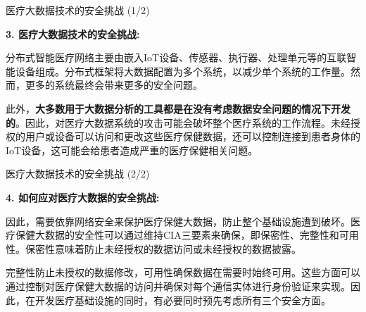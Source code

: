 \documentclass{beamer}
\begin{document}

\begin{frame}{医疗大数据技术的安全挑战 (1/2)}
    \small  %
    
    \textbf{3. 医疗大数据技术的安全挑战:}
    
    \vspace{0.2cm}
    分布式智能医疗网络主要由嵌入IoT设备、传感器、执行器、处理单元等的互联智能设备组成。分布式框架将大数据配置为多个系统，以减少单个系统的工作量。然而，更多的系统最终会带来更多的安全问题。
    
    \vspace{0.2cm}
    此外，\textbf{大多数用于大数据分析的工具都是在没有考虑数据安全问题的情况下开发的}。因此，对医疗大数据系统的攻击可能会破坏整个医疗系统的工作流程。未经授权的用户或设备可以访问和更改这些医疗保健数据，还可以控制连接到患者身体的IoT设备，这可能会给患者造成严重的医疗保健相关问题。
\end{frame}

\begin{frame}{医疗大数据技术的安全挑战 (2/2)}
    \small  %
    
    \textbf{4. 如何应对医疗大数据的安全挑战:}
    
    \vspace{0.2cm}
    因此，需要依靠网络安全来保护医疗保健大数据，防止整个基础设施遭到破坏。医疗保健大数据的安全性可以通过维持CIA三要素来确保，即保密性、完整性和可用性。保密性意味着防止未经授权的数据访问或未经授权的数据披露。
    
    \vspace{0.2cm}
    完整性防止未授权的数据修改，可用性确保数据在需要时始终可用。这些方面可以通过控制对医疗保健大数据的访问并确保对每个通信实体进行身份验证来实现。因此，在开发医疗基础设施的同时，有必要同时预先考虑所有三个安全方面。
\end{frame}




\end{document}
